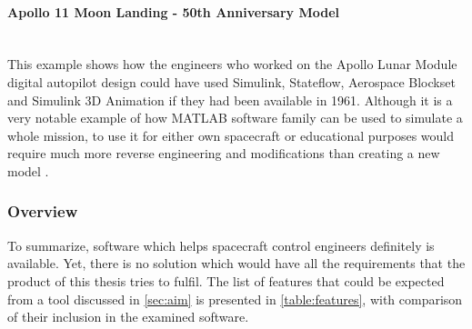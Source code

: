         \paragraph*{Apollo 11 Moon Landing - 50th Anniversary Model}\hspace{0pt}\\[0.1cm]
            This example shows how the engineers who worked on the Apollo Lunar Module digital autopilot design could have used Simulink, Stateflow, Aerospace Blockset and Simulink 3D Animation if they had been available in 1961. Although it is a very notable example of how MATLAB software family can be used to simulate a whole mission, to use it for either own spacecraft or educational purposes would require much more reverse engineering and modifications than creating a new model \cite{apollo}. 

    \subsubsection{Overview}
        To summarize, software which helps spacecraft control engineers definitely is available. Yet, there is no solution which would have all the requirements that the product of this thesis tries to fulfil. The list of features that could be expected from a tool discussed in \autoref{sec:aim} is presented in \autoref{table:features}, with comparison of their inclusion in the examined software.

